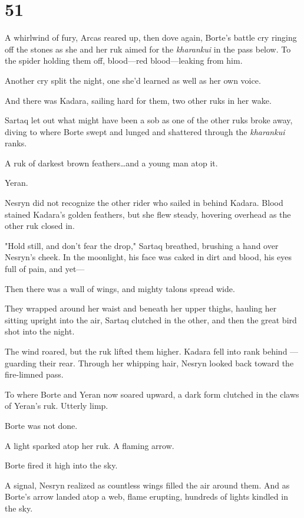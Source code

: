 
\chapter{51}

A whirlwind of fury, Arcas reared up, then dove again, Borte's battle cry ringing off the stones as she and her ruk aimed for the \emph{kharankui} in the pass below.
To the spider holding them off, blood---red blood---leaking from him.

Another cry split the night, one she'd learned as well as her own voice.

And there was Kadara, sailing hard for them, two other ruks in her wake.

Sartaq let out what might have been a sob as one of the other ruks broke away, diving to where Borte swept and lunged and shattered through the \emph{kharankui} ranks.

A ruk of darkest brown feathers\ldots and a young man atop it.

Yeran.

Nesryn did not recognize the other rider who sailed in behind Kadara.
Blood stained Kadara's golden feathers, but she flew steady, hovering overhead as the other ruk closed in.

"Hold still, and don't fear the drop," Sartaq breathed, brushing a hand over Nesryn's cheek.
In the moonlight, his face was caked in dirt and blood, his eyes full of pain, and yet---

Then there was a wall of wings, and mighty talons spread wide.

They wrapped around her waist and beneath her upper thighs, hauling her sitting upright into the air, Sartaq clutched in the other, and then the great bird shot into the night.

The wind roared, but the ruk lifted them higher.
Kadara fell into rank behind ---guarding their rear.
Through her whipping hair, Nesryn looked back toward the fire-limned pass.

To where Borte and Yeran now soared upward, a dark form clutched in the claws of Yeran's ruk.
Utterly limp.

Borte was not done.

A light sparked atop her ruk.
A flaming arrow.

Borte fired it high into the sky.

A signal, Nesryn realized as countless wings filled the air around them.
And as Borte's arrow landed atop a web, flame erupting, hundreds of lights kindled in the sky.

